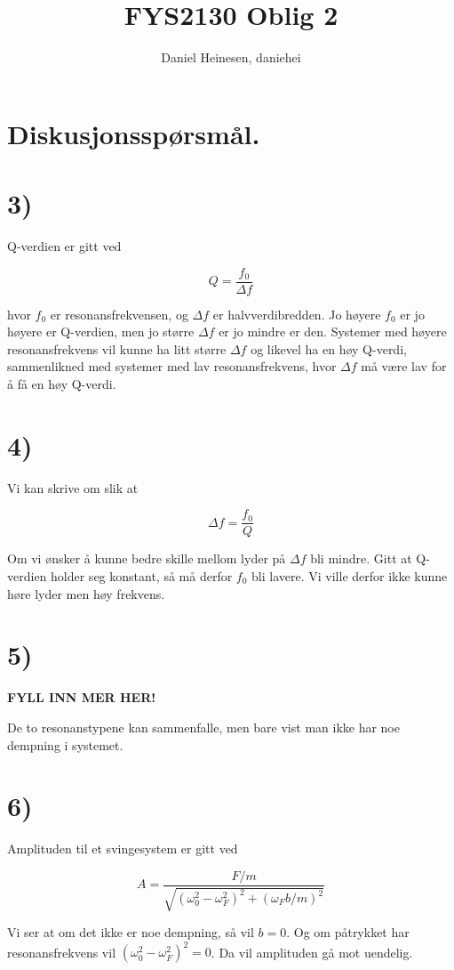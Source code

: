 \documentclass[a4paper,norsk, 10pt]{article}
\title{FYS2130 Oblig 2}
\author{Daniel Heinesen, daniehei}
\begin{document}
\maketitle


\section*{Diskusjonsspørsmål.}

\section{3)}

Q-verdien er gitt ved 

$$
Q = \frac{f_0}{\Delta f}
$$

hvor $f_0$ er resonansfrekvensen, og $\Delta f$ er halvverdibredden. Jo høyere $f_0$ er jo høyere er Q-verdien, men jo større $\Delta f$ er jo mindre er den. Systemer med høyere resonansfrekvens vil kunne ha litt større $\Delta f$ og likevel ha en høy Q-verdi, sammenlikned med systemer med lav resonansfrekvens, hvor $\Delta f$ må være lav for å få en høy Q-verdi.


\section*{4)}
Vi kan skrive om slik at 

$$
\Delta f = \frac{f_0}{Q}
$$

Om vi ønsker å kunne bedre skille mellom lyder på $\Delta f$ bli mindre. Gitt at Q-verdien holder seg konstant, så må derfor $f_0$ bli lavere. Vi ville derfor ikke kunne høre lyder men høy frekvens. 

\section*{5)}

\textbf{FYLL INN MER HER!}

De to resonanstypene kan sammenfalle, men bare vist man ikke har noe dempning i systemet.

\section*{6)}
Amplituden til et svingesystem er gitt ved

$$
A = \frac{F/m}{\sqrt{(\omega_0^2 - \omega_F^2)^2 + (\omega_Fb/m)^2}}
$$

Vi ser at om det ikke er noe dempning, så vil $b = 0$. Og om påtrykket har resonansfrekvens vil $(\omega_0^2 - \omega_F^2)^2 = 0$. Da vil amplituden gå mot uendelig.\\
\end{document}
